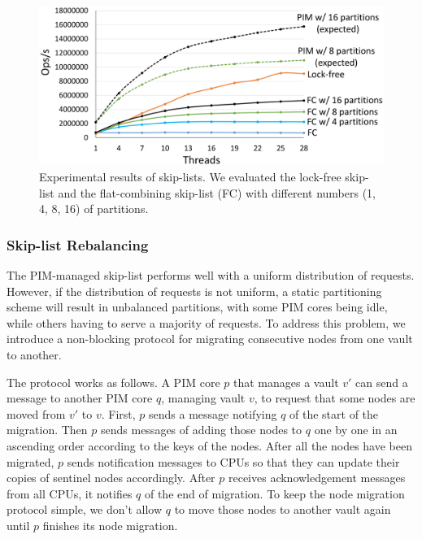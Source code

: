 \begin{figure}[ht!]
    \centering
    \includegraphics[width=1.0\linewidth]{skiplist_data.eps} %
    \caption{Experimental results of skip-lists. We evaluated the lock-free skip-list and 
    the flat-combining skip-list (FC) with different numbers (1, 4, 8, 16) of partitions.}
    \label{figure:skiplist_data}
\end{figure}


\subsubsection{Skip-list Rebalancing}
The PIM-managed skip-list performs well with a uniform distribution of requests.
However, if the distribution of requests is not uniform, a static partitioning scheme 
will result in unbalanced partitions, with some PIM cores being idle, while others having to 
serve a majority of requests. To address this problem, we introduce a non-blocking protocol for 
migrating consecutive nodes from one vault to another. 

The protocol works as follows. 
A PIM core $p$ that manages a vault $v'$ can send a message to another PIM core $q$, managing vault 
$v$, to request that some nodes are moved from $v'$ to $v$. 
First, $p$ sends a message notifying $q$ of the start of the migration. 
Then $p$ sends messages of adding those nodes to $q$ one by one in an ascending order 
according to the keys of the nodes. 
After all the nodes have been migrated, $p$ sends notification messages to CPUs so that 
they can update their copies of sentinel nodes accordingly.
After $p$ receives acknowledgement messages from all CPUs, it notifies $q$ of the end of migration.
To keep the node migration protocol simple, we don't allow $q$ to move those nodes 
to another vault again until $p$ finishes its node migration. 

